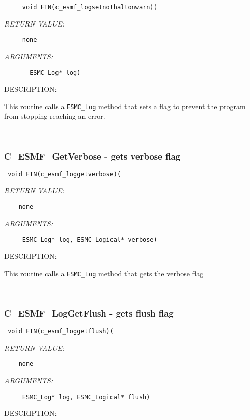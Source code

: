   
\begin{verbatim}     void FTN(c_esmf_logsetnothaltonwarn)( \end{verbatim}{\em RETURN VALUE:}
\begin{verbatim}     none\end{verbatim}{\em ARGUMENTS:}
\begin{verbatim}       ESMC_Log* log)
                        \end{verbatim}
{\sf DESCRIPTION:\\ }

 
    This routine calls a {\tt ESMC\_Log} method that sets a flag to
    prevent the program
    from stopping reaching an error.                             
 
\mbox{}\hrulefill\ 
 
\subsubsection [C\_ESMF\_GetVerbose] {C\_ESMF\_GetVerbose - gets verbose flag}


  
\begin{verbatim} void FTN(c_esmf_loggetverbose)(\end{verbatim}{\em RETURN VALUE:}
\begin{verbatim}    none\end{verbatim}{\em ARGUMENTS:}
\begin{verbatim}     ESMC_Log* log, ESMC_Logical* verbose)\end{verbatim}
{\sf DESCRIPTION:\\ }


    This routine calls a {\tt ESMC\_Log} method that gets the verbose flag
   
 
\mbox{}\hrulefill\ 
 
\subsubsection [C\_ESMF\_LogGetFlush] {C\_ESMF\_LogGetFlush - gets flush flag}


  
\begin{verbatim} void FTN(c_esmf_loggetflush)(\end{verbatim}{\em RETURN VALUE:}
\begin{verbatim}    none\end{verbatim}{\em ARGUMENTS:}
\begin{verbatim}     ESMC_Log* log, ESMC_Logical* flush)\end{verbatim}
{\sf DESCRIPTION:\\ }


